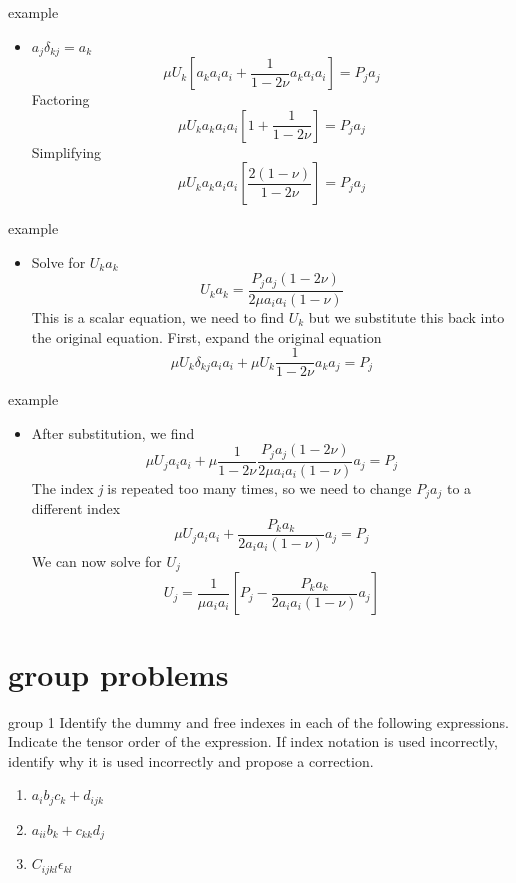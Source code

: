 \documentclass[
  letterpaper,
  ignorenonframetext,
  aspectratio=43,
  handout,
  12pt]{beamer}
\providecommand{\tightlist}{%
  \setlength{\itemsep}{0pt}\setlength{\parskip}{0pt}}
\providecommand{\tightlist}{%
\setlength{\itemsep}{0pt}\setlength{\parskip}{0pt}}
\begin{document}
\begin{frame}{example}
\protect\hypertarget{example-2}{}
\begin{itemize}
\tightlist
\item
  \(a_j \delta_{kj} = a_k\)
  \[\mu U_k \left[ a_k a_i a_i + \frac{1}{1-2\nu} a_k a_i a_i \right] = P_j a_j\]
  Factoring
  \[\mu U_k a_k a_i a_i \left[ 1 + \frac{1}{1-2\nu} \right] = P_j a_j\]
  Simplifying
  \[\mu U_k a_k a_i a_i \left[ \frac{2(1-\nu)}{1-2\nu} \right] = P_j a_j\]
\end{itemize}
\end{frame}

\begin{frame}{example}
\protect\hypertarget{example-3}{}
\begin{itemize}
\tightlist
\item
  Solve for \(U_k a_k\)
  \[U_k a_k = \frac{P_j a_j(1-2\nu)}{2\mu a_i a_i (1-\nu) }\] This is a
  scalar equation, we need to find \(U_k\) but we substitute this back
  into the original equation. First, expand the original equation
  \[\mu U_k \delta_{kj} a_i a_i + \mu U_k \frac{1}{1-2\nu} a_k a_j = P_j\]
\end{itemize}
\end{frame}

\begin{frame}{example}
\protect\hypertarget{example-4}{}
\begin{itemize}
\tightlist
\item
  After substitution, we find
  \[\mu U_j a_i a_i + \mu \frac{1}{1-2\nu} \frac{P_j a_j(1-2\nu)}{2\mu a_i a_i (1-\nu) } a_j = P_j\]
  The index \emph{j} is repeated too many times, so we need to change
  \(P_j a_j\) to a different index
  \[\mu U_j a_i a_i + \frac{P_k a_k}{2 a_i a_i (1-\nu) } a_j = P_j\] We
  can now solve for \(U_j\)
  \[U_j  = \frac{1}{\mu a_i a_i} \left[P_j - \frac{P_k a_k}{2 a_i a_i (1-\nu) } a_j\right]\]
\end{itemize}
\end{frame}

\hypertarget{group-problems}{%
\section{group problems}\label{group-problems}}

\begin{frame}{group 1}
\protect\hypertarget{group-1}{}
Identify the dummy and free indexes in each of the following
expressions. Indicate the tensor order of the expression. If index
notation is used incorrectly, identify why it is used incorrectly and
propose a correction.

\begin{enumerate}
\tightlist
\item
  \(a_i b_j c_k + d_{ijk}\)
\item
  \(a_{ii}b_k + c_{kk} d_j\)
\item
  \(C_{ijkl}\epsilon_{kl}\)
\end{enumerate}
\end{frame}
\end{document}
